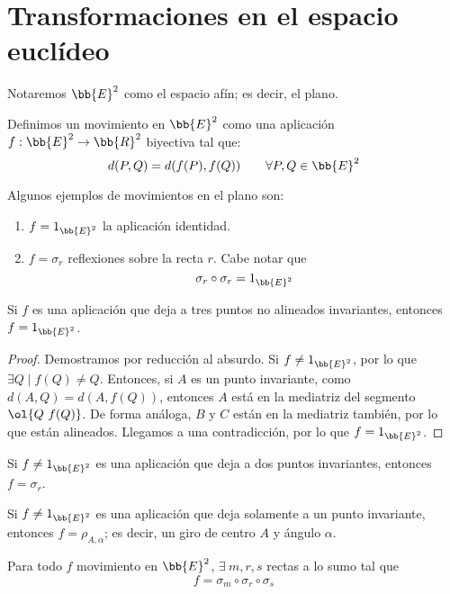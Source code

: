\chapter{Transformaciones en el espacio euclídeo}

Notaremos $\bb{E}^2$ como el espacio afín; es decir, el plano.

\begin{definicion}[Movimiento]
    Definimos un movimiento en $\bb{E}^2$ como una aplicación $f:\bb{E}^2\to \bb{R}^2$ biyectiva tal que:
    \begin{equation*}
        d(P,Q) = d(f(P), f(Q)) \qquad \forall P,Q\in \bb{E}^2
    \end{equation*}
\end{definicion}
\begin{ejemplo} Algunos ejemplos de movimientos en el plano son:
\begin{enumerate}
    \item $f=1_{\bb{E}^2}$ la aplicación identidad.
    \item $f=\sigma_r$ reflexiones sobre la recta $r$. Cabe notar que $$\sigma_r\circ \sigma_r=1_{\bb{E}^2}$$
\end{enumerate}

\begin{prop}
    Si $f$ es una aplicación que deja a tres puntos no alineados invariantes, entonces $f=1_{\bb{E}^2}$.
\end{prop}
\begin{proof}
    Demostramos por reducción al absurdo. Si $f\neq 1_{\bb{E}^2}$, por lo que $\exists Q\mid f(Q)\neq Q$. Entonces, si $A$ es un punto invariante, como $d(A,Q)=d(A,f(Q))$, entonces $A$ está en la mediatriz del segmento $\ol{Q~f(Q)}$. De forma análoga, $B$ y $C$ están en la mediatriz también, por lo que están alineados. Llegamos a una contradicción, por lo que $f=1_{\bb{E}^2}$.
\end{proof}

\begin{prop}
    Si $f\neq 1_{\bb{E}^2}$ es una aplicación que deja a dos puntos invariantes, entonces $f=\sigma_r$.
\end{prop}

\begin{prop}
    Si $f\neq 1_{\bb{E}^2}$ es una aplicación que deja solamente a un punto invariante, entonces $f=\rho_{A,\alpha}$; es decir, un giro de centro $A$ y ángulo $\alpha$.
\end{prop}


\begin{teo} Para todo $f$ movimiento en $\bb{E}^2$, $\exists~m,r,s$ rectas a lo sumo tal que $$f=\sigma_m \circ \sigma_r \circ \sigma_s$$
    
\end{teo}
    
\end{ejemplo}
